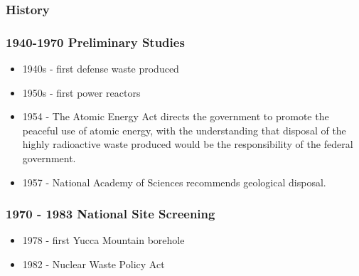 
\begin{frame}
  \frametitle{History}
  
\end{frame}
\begin{frame}
  \frametitle{1940-1970 Preliminary Studies}
  \begin{itemize}
    \item 1940s - first defense waste produced
    \item 1950s - first power reactors
    \item 1954 - The Atomic Energy Act directs the government to promote the 
      peaceful use of atomic energy, with the understanding that disposal of the 
      highly radioactive waste produced would be the responsibility of the 
      federal government.
    \item 1957 - National Academy of Sciences recommends geological disposal.
  \end{itemize}
\end{frame}

\begin{frame}
  \frametitle{1970 - 1983 National Site Screening}
  \begin{itemize}
    \item 1978 - first Yucca Mountain borehole
    \item 1982 - Nuclear Waste Policy Act
  \end{itemize}
\end{frame}

